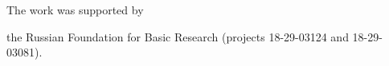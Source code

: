 





\Ack

\noindent

The work was supported by

the Russian Foundation for Basic Research (projects 18-29-03124  and 18-29-03081).



 \vspace*{-12pt}





\renewcommand{\bibname}{\protect\rmfamily References}




